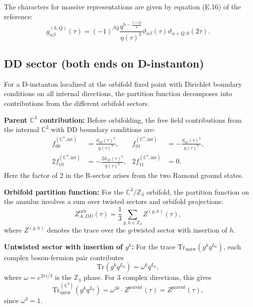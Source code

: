 \documentclass[11pt]{article}
\newcommand{\Z}{\mathbb{Z}}
\newcommand{\C}{\mathbb{C}}
\newcommand{\Tr}{\mathrm{Tr}}
\newcommand{\vt}{\vartheta}
\begin{document}
The characters for massive representations are given by equation (E.16) of the reference:
\begin{equation}\label{eq:characters}
g^{(h,Q)}_{\alpha\beta}(\tau) = (-1)^{\beta Q} \frac{q^{h - \frac{1+Q}{4}}}{\eta(\tau)^3} \vt_{\alpha\beta}(\tau) \vt_{\alpha+Q,0}(2\tau).
\end{equation}

\subsection{DD sector (both ends on D-instanton)}

For a D-instanton localized at the orbifold fixed point with Dirichlet boundary conditions on all internal directions, the partition function decomposes into contributions from the different orbifold sectors.

\textbf{Parent $\C^3$ contribution:} Before orbifolding, the free field contributions from the internal $\C^3$ with DD boundary conditions are:
\begin{align}
f_{00}^{(\C^3,\text{int})} &= \frac{\vt_{00}(\tau)^3}{\eta(\tau)^9}, & f_{01}^{(\C^3,\text{int})} &= -\frac{\vt_{01}(\tau)^3}{\eta(\tau)^9}, \\
2f_{10}^{(\C^3,\text{int})} &= -\frac{2\vt_{10}(\tau)^3}{\eta(\tau)^9}, & 2f_{11}^{(\C^3,\text{int})} &= 0.
\end{align}
Here the factor of 2 in the R-sector arises from the two Ramond ground states.

\textbf{Orbifold partition function:} For the $\C^3/\Z_3$ orbifold, the partition function on the annulus involves a sum over twisted sectors and orbifold projections:
\begin{equation}\label{eq:orbifoldZ}
Z^{\text{orb}}_{A,DD}(\tau) = \frac{1}{3} \sum_{g,h \in \Z_3} Z^{(g,h)}(\tau),
\end{equation}
where $Z^{(g,h)}$ denotes the trace over the $g$-twisted sector with insertion of $h$.

\textbf{Untwisted sector with insertion of $g^k$:} For the trace $\Tr_{\text{untw}}(g^k q^{L_0})$, each complex boson-fermion pair contributes
\begin{equation}
\Tr(g^k q^{L_0}) = \omega^k q^{L_0},
\end{equation}
where $\omega = e^{2\pi i/3}$ is the $\Z_3$ phase. For 3 complex directions, this gives
\begin{equation}
\Tr_{\text{untw}}^{(\C^3)}(g^k q^{L_0}) = \omega^{3k} \cdot Z^{\text{parent}}(\tau) = Z^{\text{parent}}(\tau),
\end{equation}
since $\omega^3 = 1$.
\end{document}
